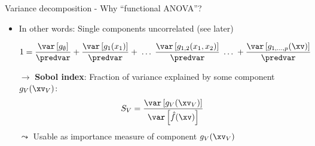 \documentclass[11pt,compress,t,notes=noshow, aspectratio=169, xcolor=table]{beamer}
\newcommand{\open}{}
\newcommand{\close}{}
\begin{document}
\begin{frame}{Variance decomposition - Why ``functional ANOVA''?
}
\begin{itemize}[<+->]
\item In other words: Single components uncorrelated (see later)


\begin{align*}
1 &= \frac{\var\left[g_{\open \emptyset \close}\right]}{\predvar} + \frac{\var\left[g_{\open 1 \close}(x_1)\right]}{\predvar} + %
\;\dots\;
\frac{\var\left[g_{\open 1, 2 \close}(x_1, x_2)\right]}{\predvar} \;\dots\; + \frac{\var\left[g_{\open 1,\ldots,p \close}(\xv)\right]}{\predvar}
\end{align*}

\item[$\rightarrow$] \textbf{Sobol index}: Fraction of variance explained by some component $g_{\open V \close}(\xv_V)$:
$$
S_V = \frac{\var\left[g_{\open V \close}(\xv_V)\right]}{\var\left[\hat{f}(\xv)\right]}
$$
$\leadsto$ Usable as importance measure of component $g_{\open V \close}(\xv_V)$\\
\end{itemize}

\end{frame}



\endlecture
\end{document}

